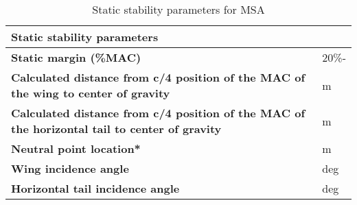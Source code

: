 \begin{table}[H]
\centering

    \begin{tabular}{@{}ll@{}}
    \toprule
    \textbf{Static stability parameters}                                                                  &       \\ \midrule
    \textbf{Static margin (\%MAC)}                                                                        & 20\%- \\
    \textbf{Calculated distance from c/4 position of the MAC of the wing to center of gravity}            & m     \\
    \textbf{Calculated distance from c/4 position of the MAC of the horizontal tail to center of gravity} & m     \\
    \textbf{Neutral point location*}                                                                      & m     \\
    \textbf{Wing incidence angle}                                                                         & deg   \\
    \textbf{Horizontal tail incidence angle}                                                              & deg   \\ \bottomrule
    \end{tabular}
\caption{Static stability parameters for MSA}
\label{tab: msa_static}
\end{table}